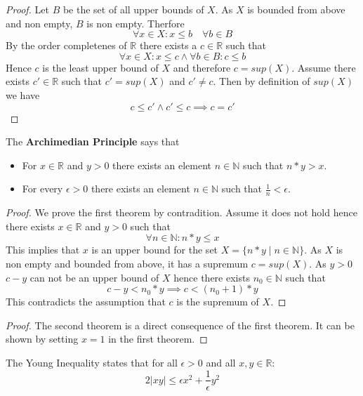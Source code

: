 \begin{proof}
    Let $B$ be the set of all upper bounds of $X$. As $X$ is bounded from above and non empty, $B$ is non empty. Therfore
    $$\forall x \in X: x \leq b \quad \forall b \in B$$
    By the order completenes of $\mathbb{R}$ there exists a $c \in \mathbb{R}$ such that
    $$\forall x \in X: x \leq c \land \forall b \in B: c \leq b$$
    Hence $c$ is the least upper bound of $X$ and therefore $c = sup(X)$. Assume there exists $c' \in \mathbb{R}$ such that $c' = sup(X)$ and $c' \neq c$. Then by definition of $sup(X)$ we have
    $$c \leq c' \land c' \leq c \implies c = c'$$
\end{proof}

\begin{theorem}
The \textbf{Archimedian Principle} says that
\begin{itemize}
    \item For $x \in \mathbb{R}$ and $y \gt 0$ there exists an element $n \in \mathbb{N}$ such that $n * y \gt x$.
    \item For every $\epsilon \gt 0$ there exists an element $n \in \mathbb{N}$ such that $\frac{1}{n} \lt \epsilon$.
\end{itemize}
\end{theorem}

\begin{proof}
    We prove the first theorem by contradition. Assume it does not hold hence there exists $x \in \mathbb{R}$ and $y \gt 0$ such that
    $$\forall n \in \mathbb{N}: n * y \leq x$$
    This implies that $x$ is an upper bound for the set $X = \{n * y \mid n \in \mathbb{N}\}$. As $X$ is non empty and bounded from above, it has a supremum $c = sup(X)$. As $y \gt 0$ $c - y$ can not be an upper bound of $X$ hence there exists $n_0 \in \mathbb{N}$ such that
    $$c - y \lt n_0 * y \implies c \lt (n_0 + 1) * y$$
    This contradicts the assumption that $c$ is the supremum of $X$.
\end{proof}    
\begin{proof}
    The second theorem is a direct consequence of the first theorem. It can be shown by setting $x = 1$ in the first theorem.
\end{proof}    
    

\begin{theorem}
The Young Inequality states that for all $\epsilon \gt 0$ and all $x, y \in \mathbb{R}$:
$$2\lvert xy \rvert \leq \epsilon x^2 + \frac{1}{\epsilon} y^2$$
\end{theorem}

